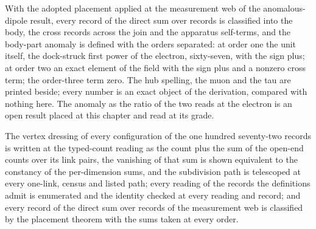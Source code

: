 \begin{chtheorem}\label{box:IV-8-ward-identity-and-the-anomaly-sums:3}
With the adopted placement applied at the measurement web of the anomalous-dipole result, every record of the direct sum over records is classified into the body, the cross records across the join and the apparatus self-terms, and the body-part anomaly is defined with the orders separated: at order one the unit itself, the dock-struck first power of the electron, sixty-seven, with the sign plus; at order two an exact element of the field with the sign plus and a nonzero cross term; the order-three term zero. The hub spelling, the muon and the tau are printed beside; every number is an exact object of the derivation, compared with nothing here. The anomaly as the ratio of the two reads at the electron is an open result placed at this chapter and read at its grade.
\end{chtheorem}
The vertex dressing of every configuration of the one hundred seventy-two records is written at the typed-count reading as the count plus the sum of the open-end counts over its link pairs, the vanishing of that sum is shown equivalent to the constancy of the per-dimension sums, and the subdivision path is telescoped at every one-link, census and listed path; every reading of the records the definitions admit is enumerated and the identity checked at every reading and record; and every record of the direct sum over records of the measurement web is classified by the placement theorem with the sums taken at every order.


